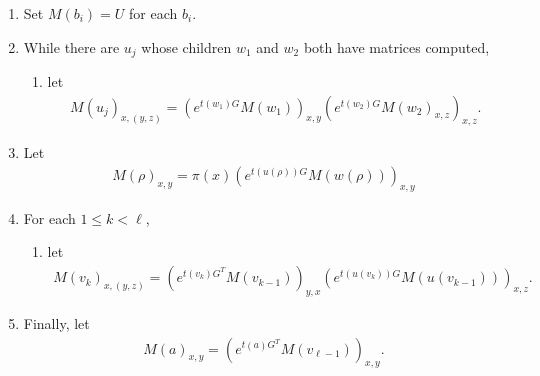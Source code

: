 \documentclass{article}
\theoremstyle{plain}
\theoremstyle{definition}
\begin{document}
\begin{enumerate}

  \item Set $M(b_i) = U$ for each $b_i$.

  \item While there are $u_j$ whose children $w_1$ and $w_2$ both have matrices computed,
    \begin{enumerate}
      \item let
        \begin{align}
          M(u_j)_{x,(y,z)} = \left( e^{t(w_1) G} M(w_1) \right)_{x,y} \left( e^{t(w_2) G} M(w_2)_{x,z} \right)_{x,z} .
        \end{align}
    \end{enumerate}

  \item Let
    \begin{align}
      M(\rho)_{x,y} = \pi(x) \left( e^{t(u(\rho)) G} M(w(\rho)) \right)_{x,y}
    \end{align}

  \item For each $1 \le k < \ell$,
    \begin{enumerate}
      \item let
        \begin{align}
          M(v_k)_{x,(y,z)} = \left( e^{t(v_k) G^T} M(v_{k-1}) \right)_{y,x} \left( e^{t(u(v_k)) G} M(u(v_{k-1})) \right)_{x,z}  .
        \end{align}
    \end{enumerate}

  \item Finally, let
    \begin{align}
      M(a)_{x,y} = \left( e^{t(a) G^T} M(v_{\ell-1}) \right)_{x,y}  .
    \end{align}

\end{enumerate}
\end{document}

